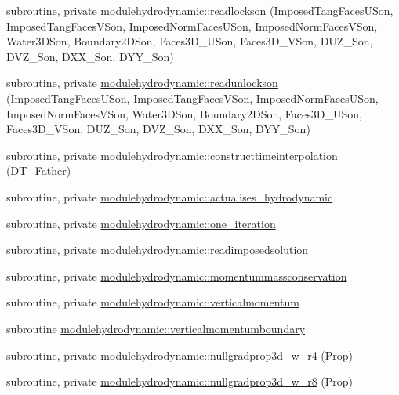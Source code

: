 \begin{DoxyCompactItemize}
\item 
subroutine, private \mbox{\hyperlink{namespacemodulehydrodynamic_ad125ca32b530446bb6be8cbf582f792e}{modulehydrodynamic\+::readlockson}} (Imposed\+Tang\+Faces\+U\+Son, Imposed\+Tang\+Faces\+V\+Son, Imposed\+Norm\+Faces\+U\+Son, Imposed\+Norm\+Faces\+V\+Son, Water3\+D\+Son, Boundary2\+D\+Son, Faces3\+D\+\_\+\+U\+Son, Faces3\+D\+\_\+\+V\+Son, D\+U\+Z\+\_\+\+Son, D\+V\+Z\+\_\+\+Son, D\+X\+X\+\_\+\+Son, D\+Y\+Y\+\_\+\+Son)
\item 
subroutine, private \mbox{\hyperlink{namespacemodulehydrodynamic_a0f4e404d78ffa5a1fef104a6f662d68d}{modulehydrodynamic\+::readunlockson}} (Imposed\+Tang\+Faces\+U\+Son, Imposed\+Tang\+Faces\+V\+Son, Imposed\+Norm\+Faces\+U\+Son, Imposed\+Norm\+Faces\+V\+Son, Water3\+D\+Son, Boundary2\+D\+Son, Faces3\+D\+\_\+\+U\+Son, Faces3\+D\+\_\+\+V\+Son, D\+U\+Z\+\_\+\+Son, D\+V\+Z\+\_\+\+Son, D\+X\+X\+\_\+\+Son, D\+Y\+Y\+\_\+\+Son)
\item 
subroutine, private \mbox{\hyperlink{namespacemodulehydrodynamic_a49aef52cb34ad32b24871447f610a2a4}{modulehydrodynamic\+::constructtimeinterpolation}} (D\+T\+\_\+\+Father)
\item 
subroutine, private \mbox{\hyperlink{namespacemodulehydrodynamic_a106c8a097031ad23a85c1c2487284b7f}{modulehydrodynamic\+::actualises\+\_\+hydrodynamic}}
\item 
subroutine, private \mbox{\hyperlink{namespacemodulehydrodynamic_a054b8ffaff698f4cc430c2f7f0bc0da9}{modulehydrodynamic\+::one\+\_\+iteration}}
\item 
subroutine, private \mbox{\hyperlink{namespacemodulehydrodynamic_aeb9df81c7e232565cec18de1a51923d0}{modulehydrodynamic\+::readimposedsolution}}
\item 
subroutine, private \mbox{\hyperlink{namespacemodulehydrodynamic_aa05a995dd1f1f6550d1ecdfb0a0bab47}{modulehydrodynamic\+::momentummassconservation}}
\item 
subroutine, private \mbox{\hyperlink{namespacemodulehydrodynamic_aa70939d9e325f64455a339e7369d5b4c}{modulehydrodynamic\+::verticalmomentum}}
\item 
subroutine \mbox{\hyperlink{namespacemodulehydrodynamic_a7b6e382d0318b7799ad5228e8148e1ac}{modulehydrodynamic\+::verticalmomentumboundary}}
\item 
subroutine, private \mbox{\hyperlink{namespacemodulehydrodynamic_a5ec24d04376be68e9e9be33881024200}{modulehydrodynamic\+::nullgradprop3d\+\_\+w\+\_\+r4}} (Prop)
\item 
subroutine, private \mbox{\hyperlink{namespacemodulehydrodynamic_a13ad3cb0f06fa1566caea1eedccae55a}{modulehydrodynamic\+::nullgradprop3d\+\_\+w\+\_\+r8}} (Prop)

\end{DoxyCompactItemize}
